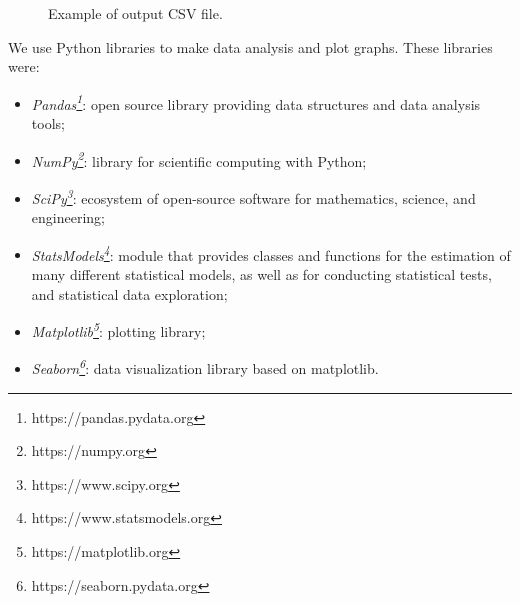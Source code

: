 \begin{figure}[H]
    \centering
    \fbox{
    \theverbbox
    }
    \caption{Example of output CSV file.}
    \label{fig-output-csv-file-example}
\end{figure}

We use Python libraries to make data analysis and plot graphs. These libraries were:
\begin{itemize}
    \item \textit{Pandas\footnote{https://pandas.pydata.org}}: open source library providing data structures and data analysis tools;
    \item \textit{NumPy\footnote{https://numpy.org}}: library for scientific computing with Python;
    \item \textit{SciPy\footnote{https://www.scipy.org}}: ecosystem of open-source software for mathematics, science, and engineering;
    \item \textit{StatsModels\footnote{https://www.statsmodels.org}}: module that provides classes and functions for the estimation of many different statistical models, as well as for conducting statistical tests, and statistical data exploration;
    \item \textit{Matplotlib\footnote{https://matplotlib.org}}: plotting library;
    \item \textit{Seaborn\footnote{https://seaborn.pydata.org}}: data visualization library based on matplotlib.
\end{itemize}





